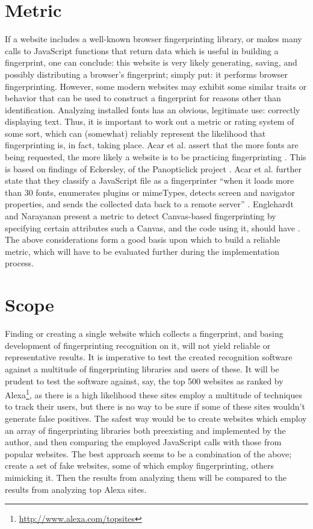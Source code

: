 \documentclass[
    fontsize=12pt,
    headings=small,
    parskip=half,
    bibliography=totoc,
    numbers=noenddot,
    open=any
    ]{scrreprt}
\begin{document}
\section{Metric}
If a website includes a well-known browser fingerprinting library, or makes many calls to JavaScript functions that return
data which is useful in building a fingerprint, one can conclude: this website is very likely generating,
saving, and possibly distributing a browser's fingerprint; simply put: it performs browser fingerprinting.
However, some modern websites may exhibit some similar traits or behavior that can be used to construct a fingerprint
for reasons other than identification. Analyzing installed fonts has an obvious, legitimate use: correctly displaying
text. Thus, it is important to work out a metric or rating system of some sort, which can
(somewhat) reliably represent the likelihood that fingerprinting is, in fact, taking place.
Acar et al. assert that the more fonts are being requested, the more likely a website is to
be practicing fingerprinting \cite{DBLP:conf/ccs/AcarJNDGPP13}.
This is based on findings of Eckersley, of the Panopticlick project \cite{eckersley2010unique}.
Acar et al. further state that they classify a JavaScript file as a fingerprinter ``when it loads
more than 30 fonts, enumerates plugins or mimeTypes, detects screen and navigator properties, and sends the
collected data back to a remote server'' \cite{DBLP:conf/ccs/AcarJNDGPP13}.
Englehardt and Narayanan present a metric to detect Canvas-based fingerprinting by specifying certain
attributes such a Canvas, and the code using it, should have \cite{DBLP:conf/ccs/EnglehardtN16}.
The above considerations form a good basis upon which to build a reliable metric, which will have to be
evaluated further during the implementation process.

\section{Scope}
Finding or creating a single website which collects a fingerprint, and basing development of fingerprinting
recognition on it, will not yield reliable or representative results. It is imperative to test
the created recognition software against a multitude of fingerprinting libraries and users of these.
It will be prudent to test the software against, say, the top 500 websites as ranked by
Alexa\footnote{\url{http://www.alexa.com/topsites}}, as there is a high likelihood these sites employ
a multitude of techniques to track their users, but there is no way to be sure if some of these sites wouldn't
generate false positives.
The safest way would be to create websites which employ an array of fingerprinting libraries both preexisting and
implemented by the author, and then comparing the employed JavaScript calls with those from popular websites.
The best approach seems to be a combination of the above; create a set of fake websites, some of which employ fingerprinting,
others mimicking it. Then the results from analyzing them will be compared to the results from analyzing top Alexa sites.
\end{document}
